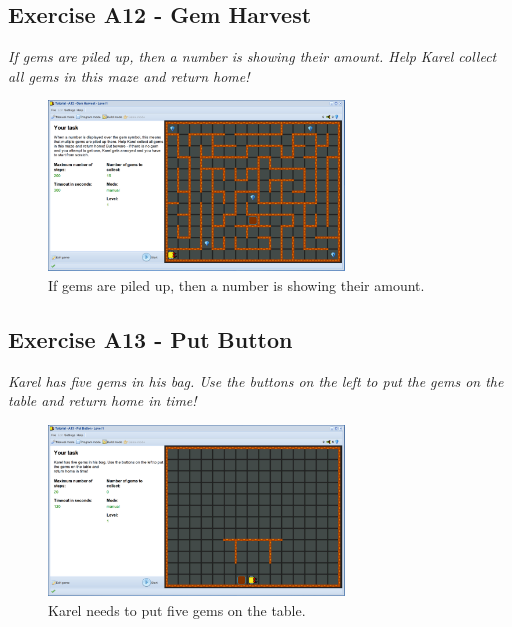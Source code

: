 \documentclass[article,A4,12pt]{llncs}
\begin{document}
\subsection{Exercise A12 - Gem Harvest}

{\em If gems are piled up, then a number is showing their amount. 
Help Karel collect all gems in this maze and return home!}\\[-7mm]

\begin{figure}[!ht]
\begin{center}
\includegraphics[width=0.7\textwidth]{img/a12.png}
\end{center}
\vspace{-4mm}
\caption{If gems are piled up, then a number is showing their amount.}
\label{fig:a12}
\vspace{-4mm}
\end{figure}
\noindent
\newpage


\subsection{Exercise A13 - Put Button}

{\em Karel has five gems in his bag. Use the buttons on the left to put the gems on the table and 
return home in time!}\\[-7mm]

\begin{figure}[!ht]
\begin{center}
\includegraphics[width=0.7\textwidth]{img/a13.png}
\end{center}
\vspace{-4mm}
\caption{Karel needs to put five gems on the table.}
\label{fig:a13}
\vspace{-4mm}
\end{figure}
\noindent
\end{document}
